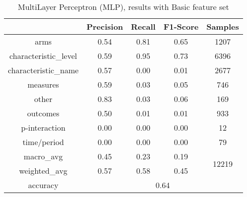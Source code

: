 \begin{table}
	\centering
	\begin{tabular}{c|c|c|c|c}
		
		& \textbf{Precision} &  \textbf{Recall} & \textbf{F1-Score} & \textbf{Samples} \\
		\hline 
		\hline 
		
		arms & 0.54 & 0.81 & 0.65 & 1207 \\ 
		\hline
		characteristic\_level & 0.59 & 0.95 & 0.73 & 6396 \\ 
		\hline
		characteristic\_name & 0.57 & 0.00 & 0.01 & 2677 \\ 
		\hline
		measures & 0.59 & 0.03 & 0.05 & 746 \\ 
		\hline
		other & 0.83 & 0.03 & 0.06 & 169 \\ 
		\hline
		outcomes & 0.50 & 0.01 & 0.01 & 933 \\ 
		\hline
		p-interaction & 0.00 & 0.00 & 0.00 & 12 \\ 
		\hline
		time/period & 0.00 & 0.00 & 0.00 & 79 \\ 
		
		\hline
		\hline
		
		macro\_avg & 0.45 & 0.23 & 0.19 & \multirow{2}{*}{12219}  \\ 
		\cline{1-4}
		weighted\_avg & 0.57  &  0.58  &  0.45 &  \\
		\hline
		\hline	
		accuracy & \multicolumn{4}{c}{0.64} \\ 
		\hline
	\end{tabular} 
	\caption{\label{tab:MLP-semantic} MultiLayer Perceptron (MLP), results with Basic feature set }
\end{table}